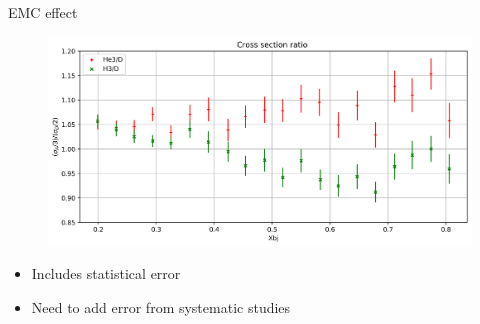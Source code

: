 \documentclass{beamer}
\begin{document}
\begin{frame}
\begin{block}{EMC effect}
\begin{figure}
\includegraphics[width=12.0cm]{../images/EMC_final}
\end{figure}
\vspace{-20pt}
\begin{itemize}
\item Includes statistical error 
\item Need to add error from systematic studies

\end{itemize}

\end{block}

\end{frame}

\end{document}
